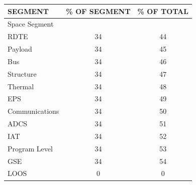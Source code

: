 \begin{table}[htbp]
	\centering

\begin{tabular}{p{10cm} | c | c }

   \textbf{SEGMENT} & \textbf{\% OF SEGMENT} & \textbf{\% OF TOTAL} \\ \hline \hline

Space Segment &          &          \\ \hline

      \hspace{1.0cm}RDTE &         34 &         44 \\ 

   \hspace{2.0cm}Payload &         34 &         45 \\

       \hspace{2.0cm}Bus &         34 &         46 \\

 \hspace{2.5cm}Structure &         34 &         47 \\

  \hspace{2.5cm}Thermal &         34 &         48 \\

      \hspace{2.5cm}EPS &         34 &         49 \\

\hspace{2.5cm}Communications &         34 &         50 \\

      \hspace{2.5cm}ADCS &         34 &         51 \\

       \hspace{2.0cm}IAT &         34 &         52 \\

 \hspace{2.0cm}Program Level &         34 &         53 \\

        \hspace{2.0cm}GSE &         34 &         54 \\

      \hspace{2.0cm}LOOS &         0 &         0 \\


\end{tabular}
\end{table}
